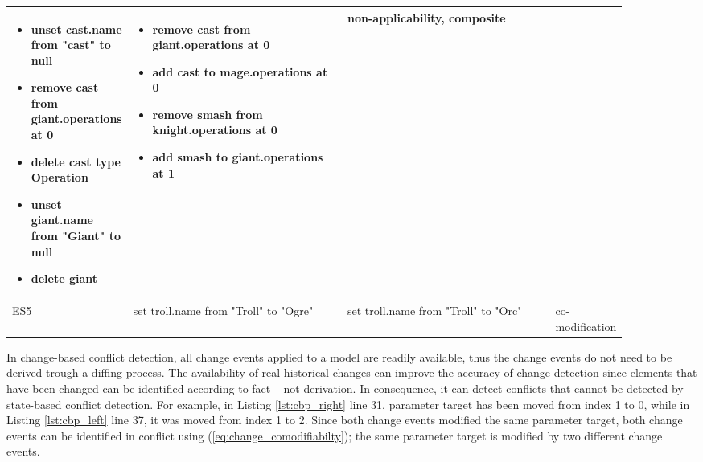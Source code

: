 \begin{table}[ht]
\begin{tabular}{|p{0.04\linewidth}|p{0.37\linewidth}|p{0.37\linewidth}|
        p{0.11\linewidth}|}
\begin{minipage}[t]{\linewidth}
\begin{itemize}[leftmargin=0pt]
          \setlength
          \item[] unset cast.name from "cast" to null
          \item[] remove cast from giant.operations at 0
          \item[] delete cast type Operation
          \item[] unset giant.name from "Giant" to null
          \item[] delete giant
        \end{itemize}
      \end{minipage}
      & 
      \begin{minipage}[t]{\linewidth}
        \raggedright
        \begin{itemize}[leftmargin=0pt]
          \setlength
          \item[] remove cast from giant.operations at 0
          \item[] add cast to mage.operations at 0
          \item[] remove smash from knight.operations at 0
          \item[] add smash to giant.operations at 1
        \end{itemize}
      \end{minipage}
      & 
      non-applicability, composite\\
      \hline
      ES5 & 
      set troll.name from "Troll" to "Ogre" & 
      set troll.name from "Troll" to "Orc" & 
      co-modification\\ 
      \hline
    \end{tabular}
\end{table}

In change-based conflict detection, all change events applied to a model are readily available, thus the change events do not need to be derived trough a diffing process. The availability of real historical changes can improve the accuracy of change detection since elements that have been changed can be identified according to fact -- not derivation. In consequence, it can detect conflicts that cannot be detected by state-based conflict detection. For example, in Listing \ref{lst:cbp_right} line 31, parameter \textsf{target} has been moved from index 1 to 0, while in Listing \ref{lst:cbp_left} line 37, it was moved from index 1 to 2. Since both change events modified the same parameter \textsf{target}, both change events can be identified in conflict using (\ref{eq:change_comodifiabilty}); the same parameter \textsf{target} is modified by two different change events. 

